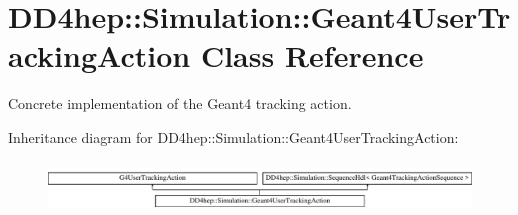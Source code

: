 \hypertarget{class_d_d4hep_1_1_simulation_1_1_geant4_user_tracking_action}{}\section{D\+D4hep\+:\+:Simulation\+:\+:Geant4\+User\+Tracking\+Action Class Reference}
\label{class_d_d4hep_1_1_simulation_1_1_geant4_user_tracking_action}


Concrete implementation of the Geant4 tracking action.  


Inheritance diagram for D\+D4hep\+:\+:Simulation\+:\+:Geant4\+User\+Tracking\+Action\+:\begin{figure}[H]
\begin{center}
\leavevmode
\includegraphics[height=1.349398cm]{class_d_d4hep_1_1_simulation_1_1_geant4_user_tracking_action}
\end{center}
\end{figure}
